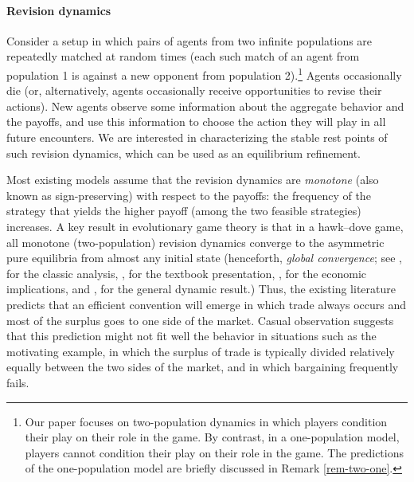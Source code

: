 \documentclass[12pt]{article}
\numberwithin{equation}{section}
\numberwithin{figure}{section}
\theoremstyle{definition}
\theoremstyle{plain}
\theoremstyle{plain}
\theoremstyle{plain}
\theoremstyle{remark}
\theoremstyle{plain}
\theoremstyle{plain}
\begin{document}
\paragraph{Revision dynamics}

Consider a setup in which pairs of agents from two infinite populations are repeatedly matched at random times (each such match of an agent from population 1 is against a new opponent from population 2).\footnote{Our paper focuses on two-population dynamics in which players condition their play on their role in the game. By contrast, in a one-population model, players cannot condition their play on their role in the game. The predictions of the one-population model are briefly discussed in Remark \ref{rem-two-one}.} Agents occasionally die (or, alternatively, agents occasionally receive opportunities to revise their actions). New agents observe some information about the aggregate behavior and the payoffs, and use this information to choose the action they will play in all future encounters. We are interested in characterizing the stable rest points of such revision dynamics, which can be used as an equilibrium refinement.

Most existing models assume that the revision dynamics are \emph{monotone} (also known as sign-preserving) with respect to the payoffs: the frequency of the strategy that yields the higher payoff (among the two feasible strategies) increases. A key result in evolutionary game theory is that in a hawk--dove game, all monotone
(two-population) revision dynamics converge to the asymmetric pure equilibria  from almost any initial state (henceforth, \emph{global convergence}; see \citealp{smith1976logic}, for the classic analysis, \citealp{smith1982evolution}, for the textbook presentation, \citealp{sugden1989spontaneous}, for the economic implications, and \citealp{oprea2011separating}, for the general dynamic result.)  Thus, the existing literature predicts that an efficient convention 
will emerge in which trade always occurs and most of the surplus goes to one side of the market. Casual observation suggests that this prediction might not fit well the behavior in situations such as the motivating example, in which the surplus of trade is typically divided relatively equally between the two sides of the market, and in which bargaining frequently fails.
\end{document}
